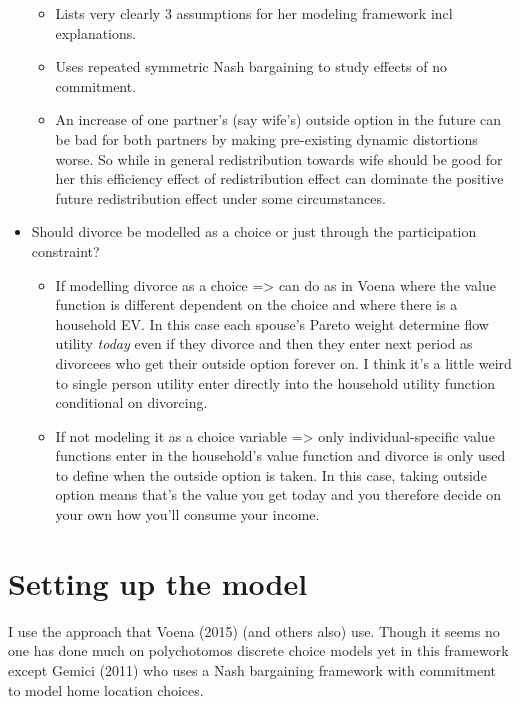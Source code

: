 \begin{itemize}
\begin{itemize}
\item Lists very clearly 3 assumptions for her modeling framework incl explanations.
\item Uses repeated symmetric Nash bargaining to study effects of no commitment. 
\item An increase of one partner’s (say wife’s) outside option in the future can be bad for both partners by making pre-existing dynamic distortions worse. So while in general redistribution towards wife should be good for her this efficiency effect of redistribution effect can dominate the positive future redistribution effect under some circumstances.
\end{itemize}
\item Should divorce be modelled as a choice or just through the participation constraint?
\begin{itemize}
\item If modelling divorce as a choice => can do as in Voena where the value function is different dependent on the choice and where there is a household EV. In this case each spouse's Pareto weight determine flow utility \textit{today} even if they divorce and then they enter next period as divorcees who get their outside option forever on. I think it's a little weird to single person utility enter directly into the household utility function conditional on divorcing. 
\item If not modeling it as a choice variable => only individual-specific value functions enter in the household's value function and divorce is only used to define when the outside option is taken. In this case, taking outside option means that's the value you get today and you therefore decide on your own how you'll consume your income.
\end{itemize}
\end{itemize}

\section{Setting up the model}

I use the approach that Voena (2015) (and others also) use. Though it seems no one has done much on polychotomos discrete choice models yet in this framework except Gemici (2011) who uses a Nash bargaining framework with commitment to model home location choices. 

